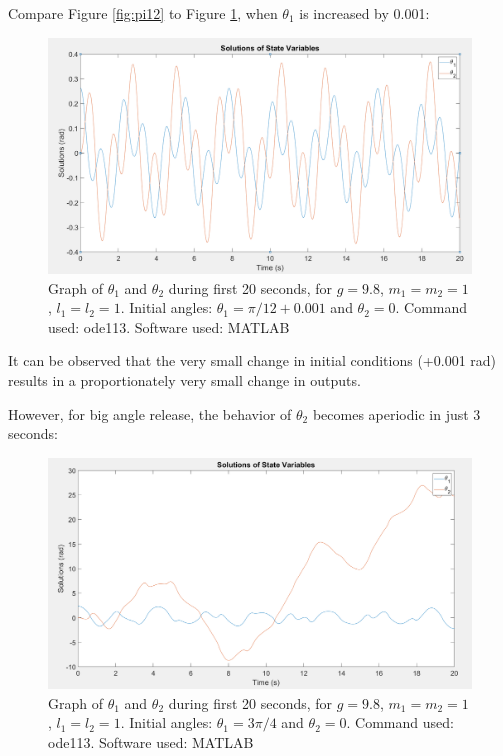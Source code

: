 \documentclass[a4paper,12pt]{article}
\begin{document}
Compare Figure \ref{fig:pi12} to Figure \ref{fig:pi12-001}, when $\theta_1$ is increased by 0.001:
\begin{figure}[H]
    \centering
    \includegraphics[width=.9\textwidth]{pi12-001}
    \caption{Graph of $\theta_1$ and $\theta_2$ during first 20 seconds, for $g = 9.8$, $m_1 = m_2 = 1$, $l_1 = l_2 = 1$. Initial angles: $\theta_1 = \pi/12+ 0.001$ and $\theta_2=0$. Command used: ode113. Software used: MATLAB}
    \label{fig:pi12-001}
\end{figure}
It can be observed that the very small change in initial conditions (+0.001 rad) results in a proportionately very small change in outputs. 

However, for big angle release, the behavior of $\theta_2$ becomes aperiodic in just 3 seconds:
\begin{figure}[H]
    \centering
    \includegraphics[width=.9\textwidth]{3pi4}
    \caption{Graph of $\theta_1$ and $\theta_2$ during first 20 seconds, for $g = 9.8$, $m_1 = m_2 = 1$, $l_1 = l_2 = 1$. Initial angles: $\theta_1 = 3\pi/4$ and $\theta_2=0$. Command used: ode113. Software used: MATLAB}
    \label{fig:3pi4}
\end{figure}
\end{document}
